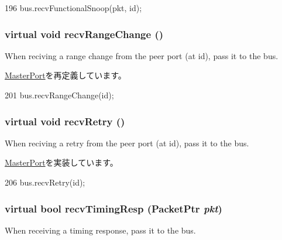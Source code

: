 \begin{DoxyCode}
196         { bus.recvFunctionalSnoop(pkt, id); }
\end{DoxyCode}
\hypertarget{classCoherentBus_1_1CoherentBusMasterPort_af60d9c2c17fb4c9ebc5384a7e0c9f289}{
\subsubsection[{recvRangeChange}]{\setlength{\rightskip}{0pt plus 5cm}virtual void recvRangeChange ()}}
\label{classCoherentBus_1_1CoherentBusMasterPort_af60d9c2c17fb4c9ebc5384a7e0c9f289}
When reciving a range change from the peer port (at id), pass it to the bus. 

\hyperlink{classMasterPort_af60d9c2c17fb4c9ebc5384a7e0c9f289}{MasterPort}を再定義しています。


\begin{DoxyCode}
201         { bus.recvRangeChange(id); }
\end{DoxyCode}
\hypertarget{classCoherentBus_1_1CoherentBusMasterPort_a7ec461ad187b82b4b21e27c86e45cf9c}{
\subsubsection[{recvRetry}]{\setlength{\rightskip}{0pt plus 5cm}virtual void recvRetry ()}}
\label{classCoherentBus_1_1CoherentBusMasterPort_a7ec461ad187b82b4b21e27c86e45cf9c}
When reciving a retry from the peer port (at id), pass it to the bus. 

\hyperlink{classMasterPort_ac1ccc3bcf7ebabb20b57fab99b2be5b0}{MasterPort}を実装しています。


\begin{DoxyCode}
206         { bus.recvRetry(id); }
\end{DoxyCode}
\hypertarget{classCoherentBus_1_1CoherentBusMasterPort_a197a199a6dabb291067a978d54bd2d04}{
\subsubsection[{recvTimingResp}]{\setlength{\rightskip}{0pt plus 5cm}virtual bool recvTimingResp ({\bf PacketPtr} {\em pkt})}}
\label{classCoherentBus_1_1CoherentBusMasterPort_a197a199a6dabb291067a978d54bd2d04}
When receiving a timing response, pass it to the bus. 

